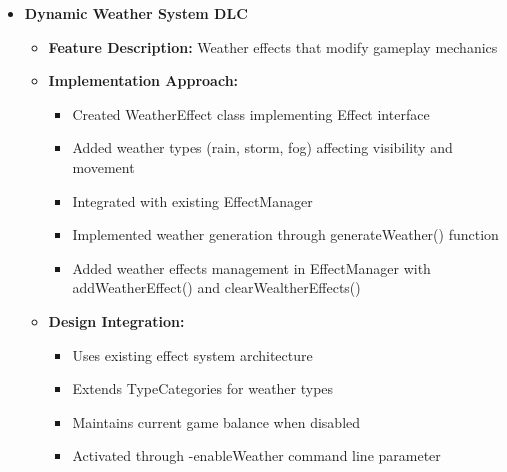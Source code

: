 \documentclass{article}
\begin{document}
\begin{itemize}
    \item \textbf{Dynamic Weather System DLC}
    \begin{itemize}
        \item \textbf{Feature Description:} Weather effects that modify gameplay mechanics
        \item \textbf{Implementation Approach:}
        \begin{itemize}
            \item Created WeatherEffect class implementing Effect interface
            \item Added weather types (rain, storm, fog) affecting visibility and movement
            \item Integrated with existing EffectManager
            \item Implemented weather generation through generateWeather() function
            \item Added weather effects management in EffectManager with addWeatherEffect() and clearWealtherEffects()
        \end{itemize}
        \item \textbf{Design Integration:}
        \begin{itemize}
            \item Uses existing effect system architecture
            \item Extends TypeCategories for weather types
            \item Maintains current game balance when disabled
            \item Activated through -enableWeather command line parameter
        \end{itemize}
    \end{itemize}


\end{itemize}
\end{document}
